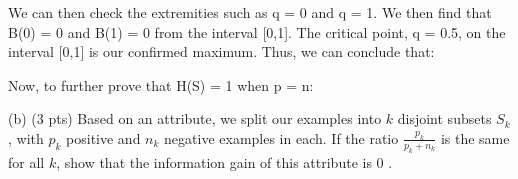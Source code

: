 \documentclass[10pt]{article}
\begin{document}
\begin{flushleft}
\hspace{1 cm}

We can then check the extremities such as q = 0 and q = 1. We then find that B(0) = 0 and B(1) = 0 from the interval [0,1]. The critical point, q = 0.5, on the interval [0,1] is our confirmed maximum. Thus, we can conclude that: 

\hspace{1 cm}

\noindent{}

\hspace{1 cm}

Now, to further prove that H(S) = 1 when p = n:

\hspace{1 cm}

\noindent{}
    
\end{flushleft}

\hspace{1 cm}

(b) (3 pts) Based on an attribute, we split our examples into $k$ disjoint subsets $S_{k}$, with $p_{k}$ positive and $n_{k}$ negative examples in each. If the ratio $\frac{p_{k}}{p_{k}+n_{k}}$ is the same for all $k$, show that the information gain of this attribute is 0 .
\end{document}
